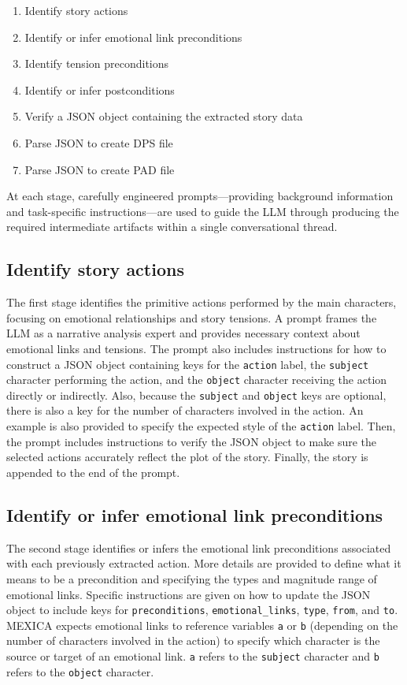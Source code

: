\documentclass[phd,electronic,oneside,twosidetoc,letterpaper,chaptercenter,parttop,lof]{byumsphd}
\begin{document}
\begin{enumerate}
\item Identify story actions
\item Identify or infer emotional link preconditions
\item Identify tension preconditions
\item Identify or infer postconditions
\item Verify a JSON object containing the extracted story data
\item Parse JSON to create DPS file
\item Parse JSON to create PAD file
\end{enumerate}

At each stage, carefully engineered prompts—providing background information and task-specific instructions—are used to guide the LLM through producing the required intermediate artifacts within a single conversational thread.


\subsection{Identify story actions}

The first stage identifies the primitive actions performed by the main characters, focusing on emotional relationships and story tensions. A prompt frames the LLM as a narrative analysis expert and provides necessary context about emotional links and tensions. The prompt also includes instructions for how to construct a JSON object containing keys for the \texttt{action} label, the \texttt{subject} character performing the action, and the \texttt{object} character receiving the action directly or indirectly. Also, because the \texttt{subject} and \texttt{object} keys are optional, there is also a key for the number of characters involved in the action. An example is also provided to specify the expected style of the \texttt{action} label. Then, the prompt includes instructions to verify the JSON object to make sure the selected actions accurately reflect the plot of the story. Finally, the story is appended to the end of the prompt.


\subsection{Identify or infer emotional link preconditions}

The second stage identifies or infers the emotional link preconditions associated with each previously extracted action. More details are provided to define what it means to be a precondition and specifying the types and magnitude range of emotional links. Specific instructions are given on how to update the JSON object to include keys for \texttt{preconditions}, \texttt{emotional\_links}, \texttt{type}, \texttt{from}, and \texttt{to}. MEXICA expects emotional links to reference variables \texttt{a} or \texttt{b} (depending on the number of characters involved in the action) to specify which character is the source or target of an emotional link. \texttt{a} refers to the \texttt{subject} character and \texttt{b} refers to the \texttt{object} character.
\end{document}
